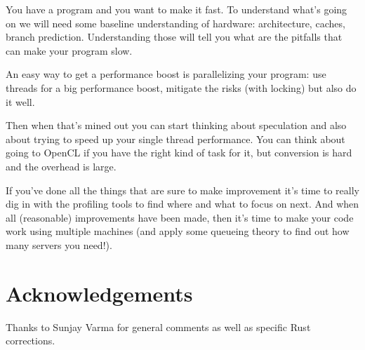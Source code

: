You have a program and you want to make it fast. To understand what's going on we will need some baseline understanding of hardware: architecture, caches, branch prediction. Understanding those will tell you what are the pitfalls that can make your program slow.

An easy way to get a performance boost is parallelizing your program: use threads for a big performance boost, mitigate the risks (with locking) but also do it well. 

Then when that's mined out you can start thinking about speculation and also about trying to speed up your single thread performance. You can think about going to OpenCL if you have the right kind of task for it, but conversion is hard and the overhead is large. 

If you've done all the things that are sure to make improvement it's time to really dig in with the profiling tools to find where and what to focus on next. And when all (reasonable) improvements have been made, then it's time to make your code work using multiple machines (and apply some queueing theory to find out how many servers you need!).

\section*{Acknowledgements} Thanks to Sunjay Varma for general comments as well as specific Rust corrections.




